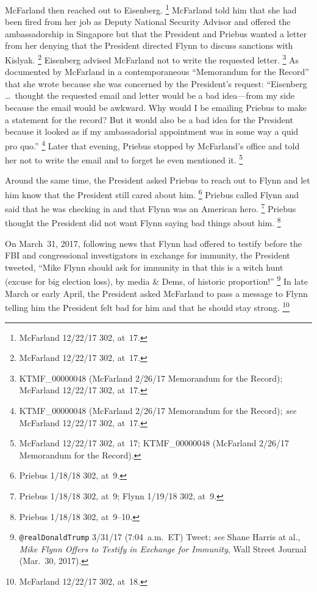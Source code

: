 McFarland then reached out to Eisenberg.%
\footnote{McFarland 12/22/17 302, at~17.}
McFarland told him that she had been fired from her job as Deputy National Security Advisor and offered the ambassadorship in Singapore but that the President and Priebus wanted a letter from her denying that the President directed Flynn to discuss sanctions with Kislyak.%
\footnote{McFarland 12/22/17 302, at~17.}
Eisenberg advised McFarland not to write the requested letter.%
\footnote{KTMF\_00000048 (McFarland 2/26/17 Memorandum for the Record);
McFarland 12/22/17 302, at~17.}
As documented by McFarland in a contemporaneous ``Memorandum for the Record'' that she wrote because she was concerned by the President's request:
``Eisenberg \dots\ thought the requested email and letter would be a bad idea---from my side because the email would be awkward.
Why would I be emailing Priebus to make a statement for the record?
But it would also be a bad idea for the President because it looked as if my ambassadorial appointment was in some way a quid pro quo.''%
\footnote{KTMF\_00000048 (McFarland 2/26/17 Memorandum for the Record);
\textit{see} McFarland 12/22/17 302, at~17.}
Later that evening, Priebus stopped by McFarland's office and told her not to write the email and to forget he even mentioned it.%
\footnote{McFarland 12/22/17 302, at~17;
KTMF\_00000048 (McFarland 2/26/17 Memorandum for the Record).}

Around the same time, the President asked Priebus to reach out to Flynn and let him know that the President still cared about him.%
\footnote{Priebus 1/18/18 302, at~9.}
Priebus called Flynn and said that he was checking in and that Flynn was an American hero.%
\footnote{Priebus 1/18/18 302, at~9;
Flynn 1/19/18 302, at~9.}
Priebus thought the President did not want Flynn saying bad things about him.%
\footnote{Priebus 1/18/18 302, at~9--10.}

On March~31, 2017, following news that Flynn had offered to testify before the FBI and congressional investigators in exchange for immunity, the President tweeted,
``Mike Flynn should ask for immunity in that this is a witch hunt (excuse for big election loss), by media \& Dems, of historic proportion!''%
\footnote{\verb+@realDonaldTrump+ 3/31/17 (7:04~a.m.~ET) Tweet;
\textit{see} Shane Harris at al., \textit{Mike Flynn Offers to Testify in Exchange for Immunity}, Wall Street Journal (Mar.~30, 2017).}
In late March or early April, the President asked McFarland to pass a message to Flynn telling him the President felt bad for him and that he should stay strong.%
\footnote{McFarland 12/22/17 302, at~18.}

